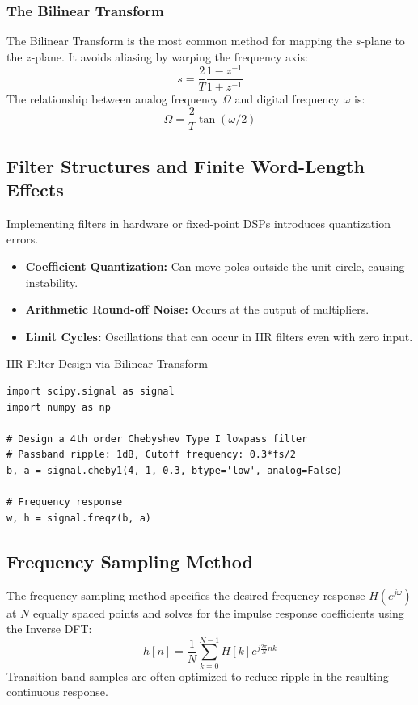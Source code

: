 \subsubsection{The Bilinear Transform}
The Bilinear Transform is the most common method for mapping the $s$-plane to the $z$-plane. It avoids aliasing by warping the frequency axis:
\begin{equation}
    s = \frac{2}{T} \frac{1 - z^{-1}}{1 + z^{-1}}
\end{equation}
The relationship between analog frequency $\Omega$ and digital frequency $\omega$ is:
\begin{equation}
    \Omega = \frac{2}{T} \tan(\omega/2)
\end{equation}

\subsection{Filter Structures and Finite Word-Length Effects}
Implementing filters in hardware or fixed-point DSPs introduces quantization errors.
\begin{itemize}
    \item \textbf{Coefficient Quantization:} Can move poles outside the unit circle, causing instability.
    \item \textbf{Arithmetic Round-off Noise:} Occurs at the output of multipliers.
    \item \textbf{Limit Cycles:} Oscillations that can occur in IIR filters even with zero input.
\end{itemize}

\begin{pythonbox}{IIR Filter Design via Bilinear Transform}
\begin{verbatim}
import scipy.signal as signal
import numpy as np

# Design a 4th order Chebyshev Type I lowpass filter
# Passband ripple: 1dB, Cutoff frequency: 0.3*fs/2
b, a = signal.cheby1(4, 1, 0.3, btype='low', analog=False)

# Frequency response
w, h = signal.freqz(b, a)
\end{verbatim}
\end{pythonbox}

\subsection{Frequency Sampling Method}
The frequency sampling method specifies the desired frequency response $H(e^{j\omega})$ at $N$ equally spaced points and solves for the impulse response coefficients using the Inverse DFT:
\begin{equation}
    h[n] = \frac{1}{N} \sum_{k=0}^{N-1} H[k] e^{j\frac{2\pi}{N}nk}
\end{equation}
Transition band samples are often optimized to reduce ripple in the resulting continuous response.


